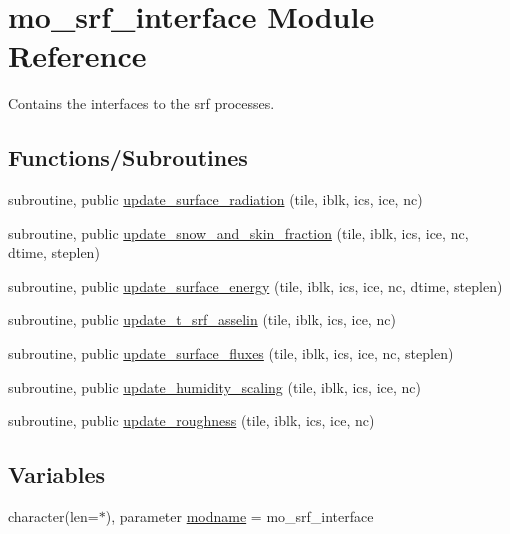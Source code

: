 \hypertarget{namespacemo__srf__interface}{}\section{mo\+\_\+srf\+\_\+interface Module Reference}
\label{namespacemo__srf__interface}


Contains the interfaces to the srf processes.  


\subsection*{Functions/\+Subroutines}
\begin{DoxyCompactItemize}
\item 
subroutine, public \hyperlink{namespacemo__srf__interface_a137b2fda7589cf50e04e3eaafc16ca43}{update\+\_\+surface\+\_\+radiation} (tile, iblk, ics, ice, nc)
\item 
subroutine, public \hyperlink{namespacemo__srf__interface_ac20b7f42f80cf50fcae6c709a2c70f8f}{update\+\_\+snow\+\_\+and\+\_\+skin\+\_\+fraction} (tile, iblk, ics, ice, nc, dtime, steplen)
\item 
subroutine, public \hyperlink{namespacemo__srf__interface_a35bdafa30fe0752a3903d61fc30173cf}{update\+\_\+surface\+\_\+energy} (tile, iblk, ics, ice, nc, dtime, steplen)
\item 
subroutine, public \hyperlink{namespacemo__srf__interface_a5633e536e2d4fb8351760c1a5c8bf972}{update\+\_\+t\+\_\+srf\+\_\+asselin} (tile, iblk, ics, ice, nc)
\item 
subroutine, public \hyperlink{namespacemo__srf__interface_acdac2acc6bb50d7ecc7dea28ea5b3e87}{update\+\_\+surface\+\_\+fluxes} (tile, iblk, ics, ice, nc, steplen)
\item 
subroutine, public \hyperlink{namespacemo__srf__interface_a5b41ccc70c29c3591021f628805678fa}{update\+\_\+humidity\+\_\+scaling} (tile, iblk, ics, ice, nc)
\item 
subroutine, public \hyperlink{namespacemo__srf__interface_ae587e1259627bd94efdfc4698cebe49a}{update\+\_\+roughness} (tile, iblk, ics, ice, nc)
\end{DoxyCompactItemize}
\subsection*{Variables}
\begin{DoxyCompactItemize}
\item 
character(len=$\ast$), parameter \hyperlink{namespacemo__srf__interface_ad2ac37413e10df5be378325501189b54}{modname} = \textquotesingle{}mo\+\_\+srf\+\_\+interface\textquotesingle{}
\end{DoxyCompactItemize}


